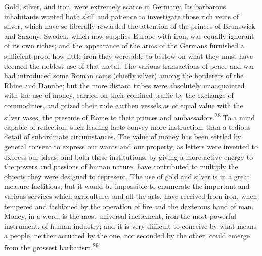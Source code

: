 Gold, silver, and iron, were extremely scarce in Germany. Its
barbarous inhabitants wanted both skill and patience to
investigate those rich veins of silver, which have so liberally
rewarded the attention of the princes of Brunswick and Saxony.
Sweden, which now supplies Europe with iron, was equally ignorant
of its own riches; and the appearance of the arms of the Germans
furnished a sufficient proof how little iron they were able to
bestow on what they must have deemed the noblest use of that
metal. The various transactions of peace and war had introduced
some Roman coins (chiefly silver) among the borderers of the
Rhine and Danube; but the more distant tribes were absolutely
unacquainted with the use of money, carried on their confined
traffic by the exchange of commodities, and prized their rude
earthen vessels as of equal value with the silver vases, the
presents of Rome to their princes and ambassadors.\textsuperscript{28} To a mind
capable of reflection, such leading facts convey more
instruction, than a tedious detail of subordinate circumstances.
The value of money has been settled by general consent to express
our wants and our property, as letters were invented to express
our ideas; and both these institutions, by giving a more active
energy to the powers and passions of human nature, have
contributed to multiply the objects they were designed to
represent. The use of gold and silver is in a great measure
factitious; but it would be impossible to enumerate the important
and various services which agriculture, and all the arts, have
received from iron, when tempered and fashioned by the operation
of fire and the dexterous hand of man. Money, in a word, is the
most universal incitement, iron the most powerful instrument, of
human industry; and it is very difficult to conceive by what
means a people, neither actuated by the one, nor seconded by the
other, could emerge from the grossest barbarism.\textsuperscript{29}



